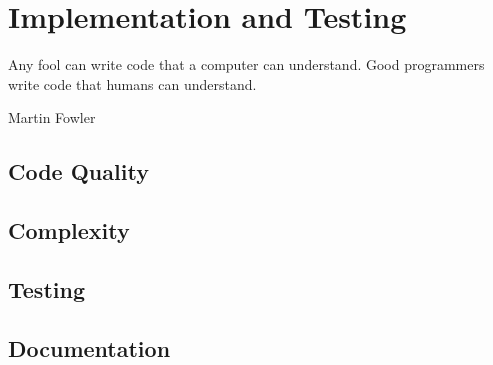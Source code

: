 \chapter{Implementation and Testing} %
\epigraph{Any fool can write code that a computer can understand. Good programmers write code that humans can understand.}{Martin Fowler}
\section{Code Quality}


\section{Complexity}
\section{Testing}
\section{Documentation}
